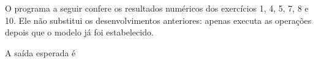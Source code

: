 O programa a seguir confere os resultados numéricos dos exercícios 1, 4, 5, 7, 8 e 10. Ele não substitui os desenvolvimentos anteriores: apenas executa as operações depois que o modelo já foi estabelecido.



A saída esperada é


